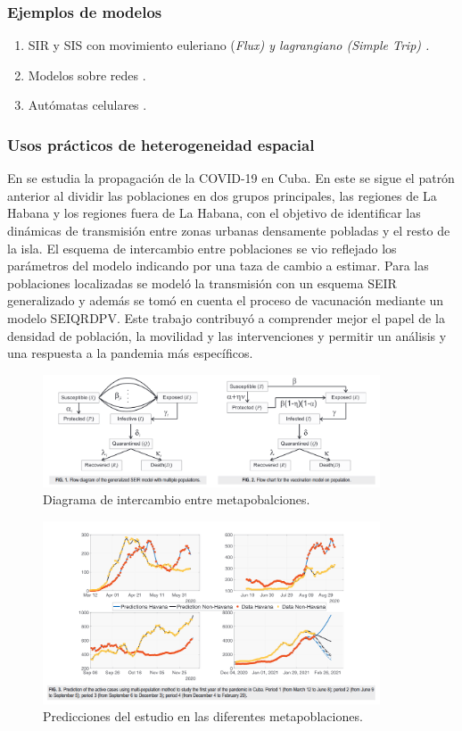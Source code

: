 \documentclass[fleqn,10pt]{SelfArx_063318} %
\begin{document}
\subsubsection{Ejemplos de modelos}

\begin{enumerate}
    \item SIR y SIS con movimiento euleriano (\it{Flux}) y lagrangiano (\it{Simple Trip}) \cite{citron2021comparing}.
    \item Modelos sobre redes \cite{mishra2017network}.
    \item Autómatas celulares \cite{medeiros2011modeling}.
\end{enumerate}

\subsubsection{Usos prácticos de heterogeneidad espacial}

En \cite{guinovart2021multi} se estudia la propagación de la COVID-19 en Cuba. En este se sigue el patrón anterior al
dividir las poblaciones en dos grupos principales,
las regiones de La Habana y los regiones fuera de La Habana, con el objetivo de identificar las dinámicas de
transmisión entre zonas urbanas densamente pobladas y el resto de la isla. El esquema de intercambio entre poblaciones
se vio reflejado los parámetros del modelo indicando por una taza de cambio a estimar. Para las poblaciones localizadas
se modeló la transmisión con un esquema SEIR generalizado y además se tomó en cuenta el proceso de vacunación mediante
un modelo SEIQRDPV. Este trabajo contribuyó a comprender mejor el papel de la densidad de población, la movilidad y las
intervenciones y permitir un análisis y una respuesta a la pandemia más específicos.

\begin{figure}[h!]
	\centering
		\includegraphics[width=10cm]{images/exchange-diagram-guino.png}%
		\caption{Diagrama de intercambio entre metapobalciones.}
\end{figure}

\begin{figure}[h!]
	\centering
		\includegraphics[width=10cm]{images/predictions-guino.png}%
		\caption{Predicciones del estudio en las diferentes metapoblaciones.}
\end{figure}
\end{document}
